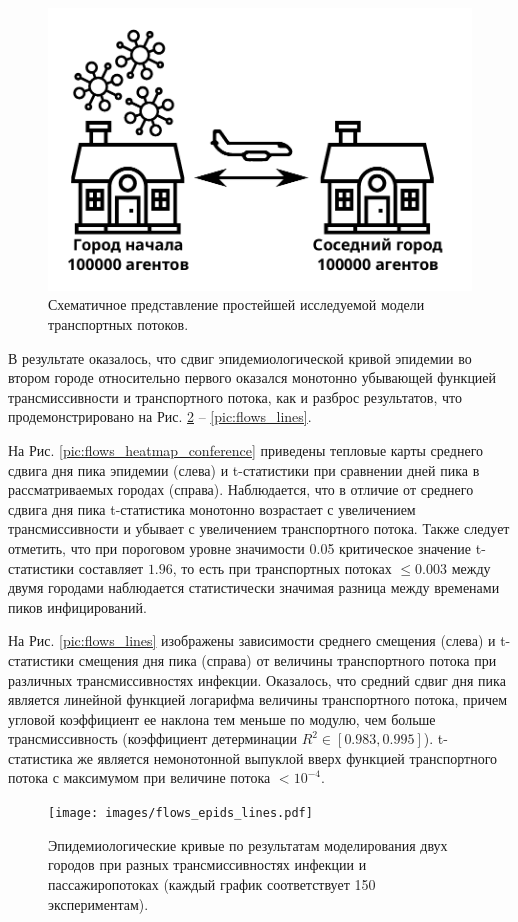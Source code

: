 \documentclass[a4paper,12pt]{article} %
\begin{document}
\begin{figure}[H]
    \centering
    \includegraphics[width=0.5\linewidth]{images/basicflows.pdf}
    \caption{Схематичное представление простейшей исследуемой модели транспортных потоков.}
    \label{pic:basicflows}
\end{figure}


В результате оказалось, что сдвиг эпидемиологической кривой эпидемии во втором городе относительно первого оказался монотонно убывающей функцией трансмиссивности и транспортного потока, как и разброс результатов, что продемонстрировано на Рис. \ref{pic:flows_epids_lines} -- \ref{pic:flows_lines}.

На Рис. \ref{pic:flows_heatmap_conference} приведены тепловые карты среднего сдвига дня пика эпидемии (слева) и t-статистики при сравнении дней пика в рассматриваемых городах (справа). Наблюдается, что в отличие от среднего сдвига дня пика t-статистика монотонно возрастает с увеличением трансмиссивности и убывает с увеличением транспортного потока. Также следует отметить, что при пороговом уровне значимости 0.05 критическое значение t-статистики составляет $1.96$, то есть при транспортных потоках $\leqslant 0.003$ между двумя городами наблюдается статистически значимая разница между временами пиков инфицирований.

На Рис. \ref{pic:flows_lines} изображены зависимости среднего смещения (слева) и t-статистики смещения дня пика (справа) от величины транспортного потока при различных трансмиссивностях инфекции. Оказалось, что средний сдвиг дня пика является линейной функцией логарифма величины транспортного потока, причем угловой коэффициент ее наклона тем меньше по модулю, чем больше трансмиссивность (коэффициент детерминации $R^2 \in [0.983, 0.995]$). t-статистика же является немонотонной выпуклой вверх функцией транспортного потока с максимумом при величине потока $< 10^{-4}$.

\begin{figure}[H]
    \centering
    \texttt{[image: images/flows\_epids\_lines.pdf]}
    \caption{Эпидемиологические кривые по результатам моделирования двух городов при разных трансмиссивностях инфекции и пассажиропотоках (каждый график соответствует 150 экспериментам).}
    \label{pic:flows_epids_lines}
\end{figure}
\end{document}
